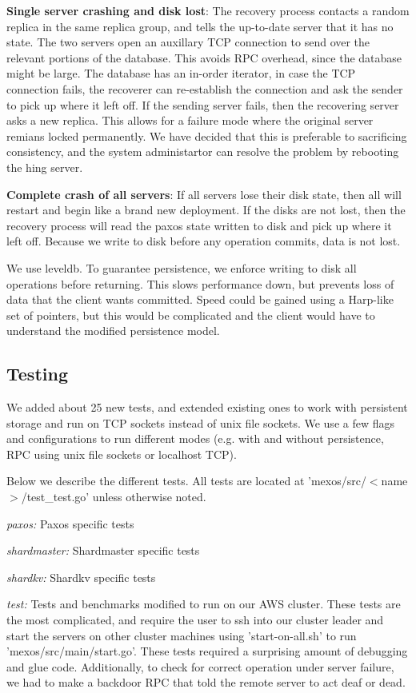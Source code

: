 \documentclass[letterpaper,10pt]{article}
\begin{document}
\textbf{Single server crashing and disk lost}: The recovery process
contacts a random replica in the same replica group, and tells the
up-to-date server that it has no state. The two servers open an
auxillary TCP connection to send over the relevant portions of the
database. This avoids RPC overhead, since the database might be large.
The database has an in-order iterator, in case the TCP connection
fails, the recoverer can re-establish the connection and ask the
sender to pick up where it left off. If the sending server fails, then
the recovering server asks a new replica. This allows for a failure
mode where the original server remians locked permanently. We have
decided that this is preferable to sacrificing consistency, and the
system administartor can resolve the problem by rebooting the hing
server.

\textbf{Complete crash of all servers}: If all servers lose their disk
state, then all will restart and begin like a brand new deployment. If
the disks are not lost, then the recovery process will read the paxos
state written to disk and pick up where it left off. Because we write
to disk before any operation commits, data is not lost.

We use leveldb. To guarantee persistence, we enforce writing to disk
all operations before returning. This slows performance down, but
prevents loss of data that the client wants committed. Speed could be
gained using a Harp-like set of pointers, but this would be
complicated and the client would have to understand the modified
persistence model.

\subsection{Testing}
We added about 25 new tests, and extended existing ones to work with
persistent storage and run on TCP sockets instead of unix file
sockets. We use a few flags and configurations to run different modes
(e.g. with and without persistence, RPC using unix file sockets or
localhost TCP).

Below we describe the different tests. All tests are located at
'mexos/src/$<$name$>$/test\_test.go' unless otherwise noted.

\emph{paxos:} Paxos specific tests

\emph{shardmaster:} Shardmaster specific tests

\emph{shardkv:} Shardkv specific tests

\emph{test:} Tests and benchmarks modified to run on our AWS
cluster. These tests are the most complicated, and require the user to
ssh into our cluster leader and start the servers on other cluster
machines using 'start-on-all.sh' to run
'mexos/src/main/start.go'. These tests required a surprising amount of
debugging and glue code. Additionally, to check for correct operation
under server failure, we had to make a backdoor RPC that told the
remote server to act deaf or dead.
\end{document}
